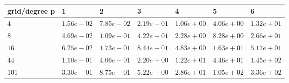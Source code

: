\begin{tabular}{lllllll}
\hline
 grid/degree p   & 1          & 2          & 3          & 4          & 5          & 6          \\
\hline
 $4$             & $1.56e-02$ & $7.85e-02$ & $2.19e-01$ & $1.06e+00$ & $4.06e+00$ & $1.32e+01$ \\
 $8$             & $4.69e-02$ & $1.09e-01$ & $4.22e-01$ & $2.28e+00$ & $8.28e+00$ & $2.66e+01$ \\
 $16$            & $6.25e-02$ & $1.73e-01$ & $8.44e-01$ & $4.83e+00$ & $1.63e+01$ & $5.17e+01$ \\
 $44$            & $1.10e-01$ & $4.06e-01$ & $2.20e+00$ & $1.22e+01$ & $4.46e+01$ & $1.45e+02$ \\
 $101$           & $3.30e-01$ & $8.75e-01$ & $5.22e+00$ & $2.86e+01$ & $1.05e+02$ & $3.36e+02$ \\
\hline
\end{tabular}